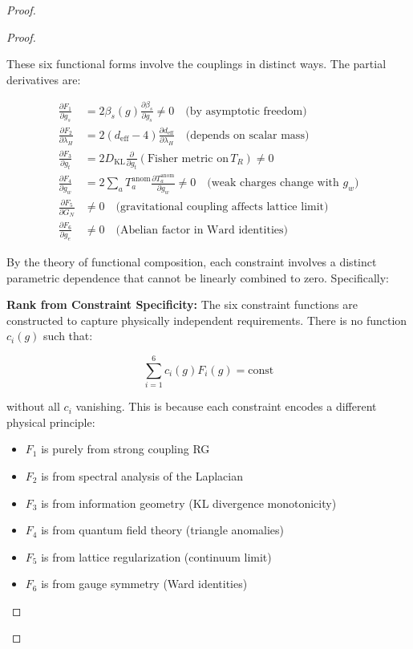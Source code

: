 {\begin{theorem}
\begin{proof}
\begin{lemma}
\begin{proof}
\begin{itemize}
\end{itemize}

These six functional forms involve the couplings in distinct ways. The partial derivatives are:

\begin{align}
\frac{\partial F_1}{\partial g_s} &= 2\beta_s(g) \frac{\partial \beta_s}{\partial g_s} \neq 0 \quad \text{(by asymptotic freedom)}\\
\frac{\partial F_2}{\partial \lambda_H} &= 2(d_{\text{eff}} - 4) \frac{\partial d_{\text{eff}}}{\partial \lambda_H} \quad \text{(depends on scalar mass)}\\
\frac{\partial F_3}{\partial g_t} &= 2D_{\text{KL}} \frac{\partial}{\partial g_t}\left(\text{Fisher metric on} \, T_R\right) \neq 0\\
\frac{\partial F_4}{\partial g_w} &= 2\sum_a T_a^{\text{anom}} \frac{\partial T_a^{\text{anom}}}{\partial g_w} \neq 0 \quad \text{(weak charges change with } g_w\text{)}\\
\frac{\partial F_5}{\partial G_N} &\neq 0 \quad \text{(gravitational coupling affects lattice limit)}\\
\frac{\partial F_6}{\partial g_e} &\neq 0 \quad \text{(Abelian factor in Ward identities)}
\end{align}

By the theory of functional composition, each constraint involves a distinct parametric dependence that cannot be linearly combined to zero. Specifically:

\textbf{Rank from Constraint Specificity:} The six constraint functions are constructed to capture physically independent requirements. There is no function $c_i(g)$ such that:

\[\sum_{i=1}^6 c_i(g) F_i(g) = \text{const}\]

without all $c_i$ vanishing. This is because each constraint encodes a different physical principle:
\begin{itemize}
\item $F_1$ is purely from strong coupling RG
\item $F_2$ is from spectral analysis of the Laplacian
\item $F_3$ is from information geometry (KL divergence monotonicity)
\item $F_4$ is from quantum field theory (triangle anomalies)
\item $F_5$ is from lattice regularization (continuum limit)
\item $F_6$ is from gauge symmetry (Ward identities)
\end{itemize}


\end{proof}
\end{lemma}
\end{proof}
\end{theorem}}
